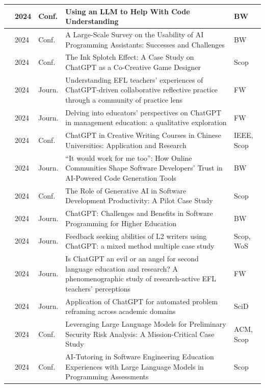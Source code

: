 {\begin{longtable}{|p{}|p{}|p{}|p{}|p{}|}
    \hline
    \cite{Nam.05202024}&2024&Conf.&Using an LLM to Help With Code Understanding&BW\\ 
    \hline
    \cite{Liang.05202024}&2024&Conf.&A Large-Scale Survey on the Usability of AI Programming Assistants: Successes and Challenges&BW\\
    \hline
    \cite{Anjum.2024}&2024&Conf.&The Ink Splotch Effect: A Case Study on ChatGPT as a Co-Creative Game Designer&Scop\\ 
    \hline
    \cite{Arefian.2024}&2024&Journ.&Understanding EFL teachers’ experiences of ChatGPT-driven collaborative reflective practice through a community of practice lens&FW\\ 
    \hline
    \cite{Bhaskar.2024}&2024&Journ.&Delving into educators’ perspectives on ChatGPT in management education: a qualitative exploration&FW\\ 
    \hline
    \cite{Chen.2024}&2024&Conf.&ChatGPT in Creative Writing Courses in Chinese Universities: Application and Research&IEEE, Scop\\ 
    \hline
    \cite{Cheng.2024}&2024&Journ.&“It would work for me too”: How Online Communities Shape Software Developers’ Trust in AI-Powered Code Generation Tools&BW\\
    \hline
     \cite{Coutinho.2024}&2024&Conf.&The Role of Generative AI in Software Development Productivity: A Pilot Case Study&Scop\\ 
    \hline
    \cite{DaSilva.2024}&2024&Journ.&ChatGPT: Challenges and Benefits in Software Programming for Higher Education&BW\\
    \hline
    \cite{DaYan.2024}&2024&Journ.&Feedback seeking abilities of L2 writers using ChatGPT: a mixed method multiple case study&Scop, WoS\\ 
    \hline
    \cite{Derakhshan.2024}&2024&Journ.&Is ChatGPT an evil or an angel for second language education and research? A phenomenographic study of research‐active EFL teachers’ perceptions&FW\\ 
    \hline
    \cite{Einarsson.2024}&2024&Journ.&Application of ChatGPT for automated problem reframing across academic domains&SciD\\ 
    \hline
    \cite{Esposito.2024}&2024&Conf.&Leveraging Large Language Models for Preliminary Security Risk Analysis: A Mission-Critical Case Study&ACM, Scop\\
    \hline
    \cite{Frankford.2024}&2024&Conf.&AI-Tutoring in Software Engineering Education Experiences with Large Language Models in Programming Assessments&Scop\\ 

\end{longtable}}
